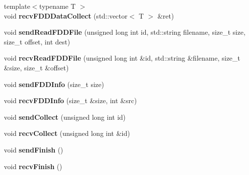 \begin{DoxyCompactItemize}
\item 
\hypertarget{classfaster_1_1fastComm_a99d64fc5917eb51878e48aa0b16e7cf2}{}{\footnotesize template$<$typename T $>$ }\\void {\bfseries recv\+F\+D\+D\+Data\+Collect} (std\+::vector$<$ T $>$ \&ret)\label{classfaster_1_1fastComm_a99d64fc5917eb51878e48aa0b16e7cf2}

\item 
\hypertarget{classfaster_1_1fastComm_a1235a0aea1570313416b46b5f73ca2c0}{}void {\bfseries send\+Read\+F\+D\+D\+File} (unsigned long int id, std\+::string filename, size\+\_\+t size, size\+\_\+t offset, int dest)\label{classfaster_1_1fastComm_a1235a0aea1570313416b46b5f73ca2c0}

\item 
\hypertarget{classfaster_1_1fastComm_aa6a698ffe5a0f0d37e6b3fb7b8c5d3c4}{}void {\bfseries recv\+Read\+F\+D\+D\+File} (unsigned long int \&id, std\+::string \&filename, size\+\_\+t \&size, size\+\_\+t \&offset)\label{classfaster_1_1fastComm_aa6a698ffe5a0f0d37e6b3fb7b8c5d3c4}

\item 
\hypertarget{classfaster_1_1fastComm_a512e3c2324c15ba73df64f4607e0b064}{}void {\bfseries send\+F\+D\+D\+Info} (size\+\_\+t size)\label{classfaster_1_1fastComm_a512e3c2324c15ba73df64f4607e0b064}

\item 
\hypertarget{classfaster_1_1fastComm_aff3221fe657da542999b25ab17b7bc1b}{}void {\bfseries recv\+F\+D\+D\+Info} (size\+\_\+t \&size, int \&src)\label{classfaster_1_1fastComm_aff3221fe657da542999b25ab17b7bc1b}

\item 
\hypertarget{classfaster_1_1fastComm_a3cf9ee0da2560c2c14b4082defd43918}{}void {\bfseries send\+Collect} (unsigned long int id)\label{classfaster_1_1fastComm_a3cf9ee0da2560c2c14b4082defd43918}

\item 
\hypertarget{classfaster_1_1fastComm_abe93aedc98fe9f135befcba281d9255d}{}void {\bfseries recv\+Collect} (unsigned long int \&id)\label{classfaster_1_1fastComm_abe93aedc98fe9f135befcba281d9255d}

\item 
\hypertarget{classfaster_1_1fastComm_ae2e21e08b8a9812d8136d12e171fdbf6}{}void {\bfseries send\+Finish} ()\label{classfaster_1_1fastComm_ae2e21e08b8a9812d8136d12e171fdbf6}

\item 
\hypertarget{classfaster_1_1fastComm_a252c0e9fe5cb45739e4499d096fb0588}{}void {\bfseries recv\+Finish} ()\label{classfaster_1_1fastComm_a252c0e9fe5cb45739e4499d096fb0588}


\end{DoxyCompactItemize}
